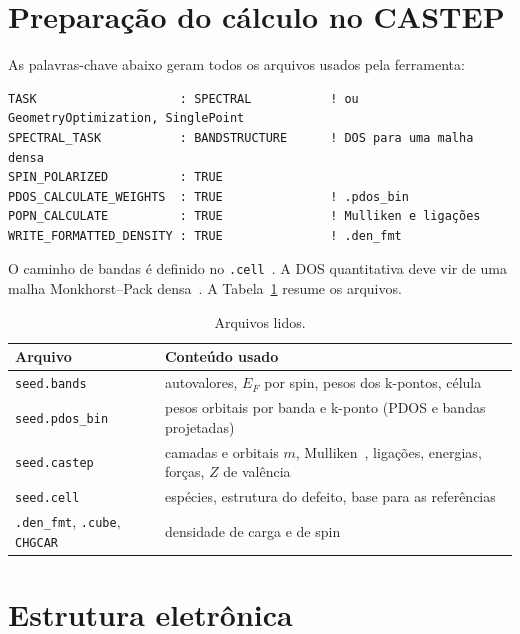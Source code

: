 \documentclass[11pt,a4paper]{article}
\begin{document}
\section{Preparação do cálculo no CASTEP}\label{sec:castep}
As palavras-chave abaixo geram todos os arquivos usados pela ferramenta:
\begin{lstlisting}
TASK                    : SPECTRAL           ! ou GeometryOptimization, SinglePoint
SPECTRAL_TASK           : BANDSTRUCTURE      ! DOS para uma malha densa
SPIN_POLARIZED          : TRUE
PDOS_CALCULATE_WEIGHTS  : TRUE               ! .pdos_bin
POPN_CALCULATE          : TRUE               ! Mulliken e ligações
WRITE_FORMATTED_DENSITY : TRUE               ! .den_fmt
\end{lstlisting}
O caminho de bandas é definido no \texttt{.cell}~\cite{setyawan2010}. A DOS quantitativa deve vir de uma malha Monkhorst--Pack densa~\cite{monkhorst1976}. A Tabela~\ref{tab:arquivos} resume os arquivos.
\begin{table}[h]\centering\small
\caption{Arquivos lidos.}\label{tab:arquivos}
\begin{tabularx}{\linewidth}{lX}\toprule
Arquivo & Conteúdo usado\\\midrule
\texttt{seed.bands} & autovalores, $E_F$ por spin, pesos dos k-pontos, célula\\
\texttt{seed.pdos\_bin} & pesos orbitais por banda e k-ponto (PDOS e bandas projetadas)\\
\texttt{seed.castep} & camadas e orbitais $m$, Mulliken~\cite{mulliken1955,segall1996}, ligações, energias, forças, $Z$ de valência\\
\texttt{seed.cell} & espécies, estrutura do defeito, base para as referências\\
\texttt{.den\_fmt}, \texttt{.cube}, \texttt{CHGCAR} & densidade de carga e de spin\\\bottomrule
\end{tabularx}
\end{table}

\section{Estrutura eletrônica}
\end{document}
